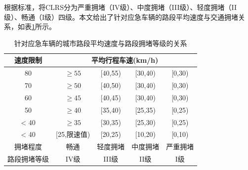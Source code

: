 根据标准\cite{GA_T_115_2020}，将CLRS分为严重拥堵（IV级）、中度拥堵（III级）、轻度拥堵（II级）、畅通（I级）四级。本文给出了针对应急车辆的路段平均速度与交通拥堵关系，如表\ref{table:CLRS}所示。


\begin{table}[H]
	\centering  %
	\caption{针对应急车辆的城市路段平均速度与路段拥堵等级的关系}  %
	\label{table:CLRS}  %
	\begin{tabular}{|c|cccc|}  
		\hline  
		速度限制 & \multicolumn{4}{c}{ 平均行程车速(km/h)} \vline \\  %
		\hline
		80 & ${\geq{55}}$ & {[}40,55) & {[}30,40) & {[}0,30) \\ 
		\hline
		70 & ${\geq{50}}$ & {[}40,50) & {[}30,40) & {[}0,30) \\ 
		\hline
		60 & ${\geq{45}}$ & {[}40,45) & {[}30,40) & {[}0,30) \\ 
		\hline
		50 & ${\geq{40}}$ & {[}35,40) & {[}25,35) & {[}0,25) \\ 
		\hline
		< 40 & ${\geq{35}}$ & {[}30,35) & {[}25,30) & {[}0,25) \\ 
		\hline
		< 40 & {[}25,限速值) & {[}20,25) & {[}10,20) & {[}0,10) \\
		\hline
		拥堵程度 & 畅通 & 轻度拥堵 & 中度拥堵 & 严重拥堵 \\
		\hline
		路段拥堵等级 & IV级 & III级 & II级 & I级 \\
		\hline
	\end{tabular}
\end{table}


